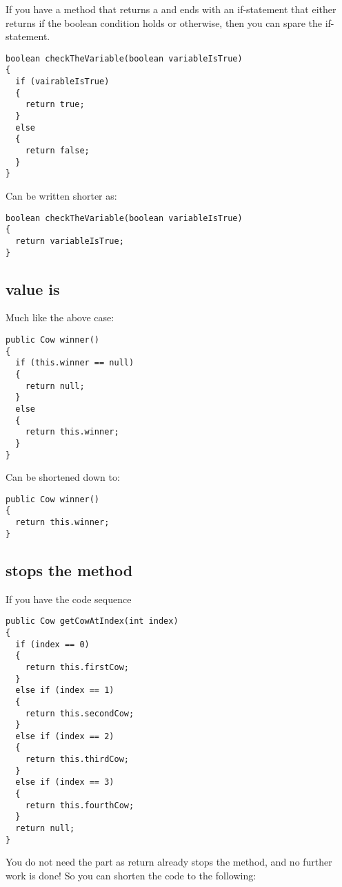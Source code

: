 If you have a method that returns a  and ends with an
if-statement that either returns  if the boolean condition holds or
 otherwise, then you can spare the if-statement.

\begin{lstlisting}
boolean checkTheVariable(boolean variableIsTrue)
{
  if (vairableIsTrue)
  {
    return true;
  }
  else
  {
    return false;
  }
}
\end{lstlisting}

Can be written shorter as:

\begin{lstlisting}
boolean checkTheVariable(boolean variableIsTrue)
{
  return variableIsTrue;
}
\end{lstlisting}

\subsection{ value is }

Much like the above case:

\begin{lstlisting}
public Cow winner()
{
  if (this.winner == null)
  {
    return null;
  }
  else
  {
    return this.winner;
  }
}
\end{lstlisting}

Can be shortened down to:

\begin{lstlisting}
public Cow winner()
{
  return this.winner;
}
\end{lstlisting}

\subsection{ stops the method}

If you have the code sequence

\begin{lstlisting}
public Cow getCowAtIndex(int index)
{
  if (index == 0)
  {
    return this.firstCow;
  }
  else if (index == 1)
  {
    return this.secondCow;
  }
  else if (index == 2)
  {
    return this.thirdCow;
  }
  else if (index == 3)
  {
    return this.fourthCow;
  }
  return null;
}
\end{lstlisting}

You do not need the  part as return already stops the method, and
no further work is done! So you can shorten the code to the following:

